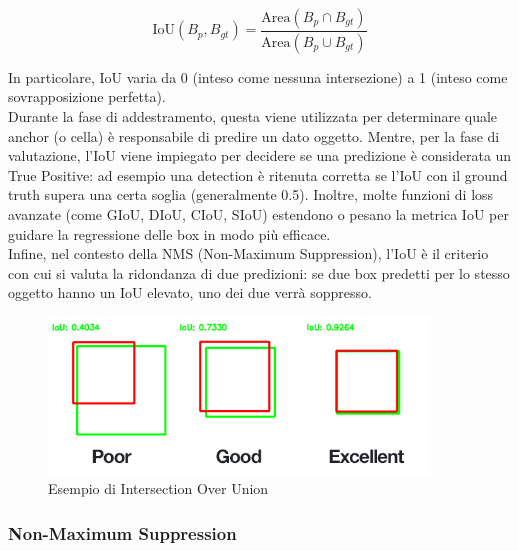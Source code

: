 \documentclass[12pt]{article}
\begin{document}
\begin{center}
\[
\mathrm{IoU}(B_p, B_{gt}) = \frac{\mathrm{Area}(B_p \cap B_{gt})}{\mathrm{Area}(B_p \cup B_{gt})}
\]
\end{center}
In particolare, IoU varia da 0 (inteso come nessuna intersezione) a 1 (inteso come sovrapposizione perfetta). \\
Durante la fase di addestramento, questa viene utilizzata per determinare quale anchor (o cella) è responsabile di predire un dato oggetto. Mentre, per la fase di valutazione, l'IoU viene impiegato per decidere se una predizione è considerata un True Positive: ad esempio una detection è ritenuta corretta se l’IoU con il ground truth supera una certa soglia (generalmente 0.5). Inoltre, molte funzioni di loss avanzate (come GIoU, DIoU, CIoU, SIoU) estendono o pesano la metrica IoU per guidare la regressione delle box in modo più efficace. \\
Infine, nel contesto della NMS (Non-Maximum Suppression), l’IoU è il criterio con cui si valuta la ridondanza di due predizioni: se due box predetti per lo stesso oggetto hanno un IoU elevato, uno dei due verrà soppresso.

\begin{figure}[H]
    \centering
    \includegraphics[width=0.90\textwidth]{./img/iou-img.png}
    \caption{Esempio di Intersection Over Union}
    \label{fig:iou-example}
\end{figure}


\subsubsection{Non-Maximum Suppression} 
\end{document}
